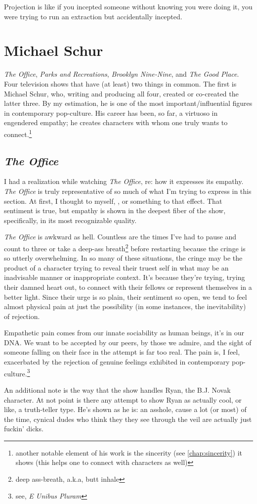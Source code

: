 \documentclass[../butidigress.tex]{subfiles}
\begin{document}
Projection is like if you incepted someone without knowing you were doing it, you were trying to run an extraction but accidentally incepted.

\section{Michael Schur}
\textit{The Office}, \textit{Parks and Recreations}, \textit{Brooklyn Nine-Nine}, and \textit{The Good Place}.
Four television shows that have (at least) two things in common.
The first is Michael Schur, who, writing and producing all four, created or co-created the latter three.
By my estimation, he is one of the most important/influential figures in contemporary pop-culture.
His career has been, so far, a virtuoso in engendered empathy; he creates characters with whom one truly wants to connect.\footnote{another notable element of his work is the sincerity (see \cref{chap:sincerity}) it shows (this helps one to connect with characters as well)}

\subsection{\textit{The Office}}
I had a realization while watching \textit{The Office}, re: how it expresses its empathy.
\textit{The Office} is truly representative of so much of what I'm trying to express in this section.
At first, I thought to myself, , or something to that effect.
That sentiment is true, but empathy is shown in the deepest fiber of the show, specifically, in its most recognizable quality.

\textit{The Office} is awkward as hell.
Countless are the times I've had to pause and count to three or take a deep-ass breath\footnote{deep ass-breath, a.k.a, butt inhale} before restarting because the cringe is so utterly overwhelming.
In so many of these situations, the cringe may be the product of a character trying to reveal their truest self in what may be an inadvisable manner or inappropriate context.
It's because they're trying, trying their damned heart out, to connect with their fellows or represent themselves in a better light.
Since their urge is so plain, their sentiment so open, we tend to feel almost physical pain at just the possibility (in some instances, the inevitability) of rejection.

Empathetic pain comes from our innate sociability as human beings, it's in our DNA.
We want to be accepted by our peers, by those we admire, and the sight of someone falling on their face in the attempt is far too real.
The pain is, I feel, exacerbated by the rejection of genuine feelings exhibited in contemporary pop-culture.\footnote{see, \textit{E Unibus Pluram}}

An additional note is the way that the show handles Ryan, the B.J. Novak character.
At not point is there any attempt to show Ryan as actually cool, or like, a truth-teller type.
He's shown as he is: an asshole, cause a lot (or most) of the time, cynical dudes who think they they see through the veil are actually just fuckin' dicks.
\end{document}
